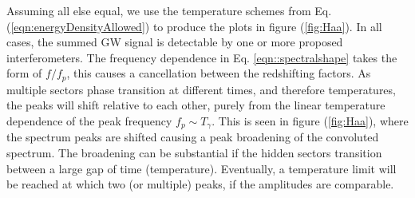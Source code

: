 \documentclass[nofootinbib,twocolumn,preprintnumbers]{revtex4-1}
\begin{document}
Assuming all else equal, we use the temperature schemes from Eq. (\ref{eqn:energyDensityAllowed}) to produce the plots in figure (\ref{fig:Haa}). In all cases, the summed GW signal is detectable by one or more proposed interferometers. The frequency dependence in Eq. \ref{eqn::spectralshape} takes the form of $f/f_{p}$, this causes a cancellation between the redshifting factors. As multiple sectors phase transition at different times, and therefore temperatures, the peaks will shift relative to each other, purely from the linear temperature dependence of the peak frequency $f_{p} \sim T_{\gamma}$.  This is seen in figure (\ref{fig:Haa}), where the spectrum peaks are shifted causing a peak broadening of the convoluted spectrum. The broadening can be substantial if the hidden sectors transition between a large gap of time (temperature). Eventually, a temperature limit will be reached at which two (or multiple) peaks, if the amplitudes are comparable. 
\end{document}
